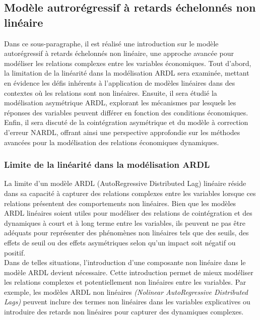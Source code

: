 \subsection{\textsf{Modèle autrorégressif à retards échelonnés non linéaire}}

Dans ce sous-paragraphe, il est réalisé une introduction sur le modèle autorégressif à retards échelonnés non linéaire, une approche avancée pour modéliser les relations complexes entre les variables économiques. Tout d'abord, la limitation de la linéarité dans la modélisation ARDL sera examinée, mettant en évidence les défis inhérents à l'application de modèles linéaires dans des contextes où les relations sont non linéaires. Ensuite, il sera étudié la modélisation asymétrique ARDL, explorant les mécanismes par lesquels les réponses des variables peuvent différer en fonction des conditions économiques. Enfin, il sera discuté de la cointégration asymétrique et du modèle à correction d'erreur NARDL, offrant ainsi une perspective approfondie sur les méthodes avancées pour la modélisation des relations économiques dynamiques.

\subsubsection{\textsf{Limite de la linéarité dans la modélisation ARDL}}

La limite d'un modèle ARDL (AutoRegressive Distributed Lag) linéaire réside dans sa capacité à capturer des relations complexes entre les variables lorsque ces relations présentent des comportements non linéaires. Bien que les modèles ARDL linéaires soient utiles pour modéliser des relations de cointégration et des dynamiques à court et à long terme entre les variables, ils peuvent ne pas être adéquats pour représenter des phénomènes non linéaires tels que des seuils, des effets de seuil ou des effets asymétriques selon qu'un impact soit négatif ou positif.\\

Dans de telles situations, l'introduction d'une composante non linéaire dans le modèle ARDL devient nécessaire. Cette introduction permet de mieux modéliser les relations complexes et potentiellement non linéaires entre les variables. Par exemple, les modèles ARDL non linéaires \textit{(Nolinear AutoRegressive Distributed Lags)} peuvent inclure des termes non linéaires dans les variables explicatives ou introduire des retards non linéaires pour capturer des dynamiques complexes.\\

